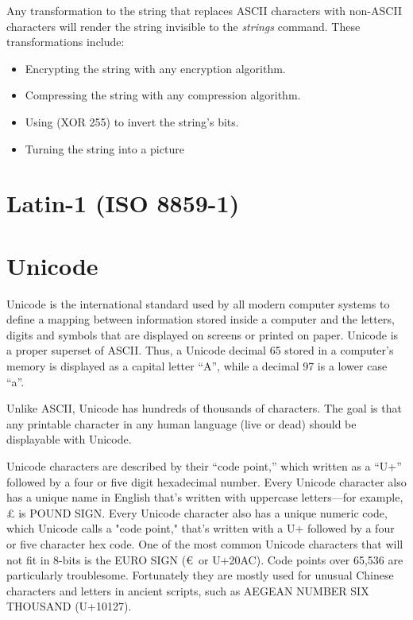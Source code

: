 Any transformation to the string that replaces ASCII characters with
non-ASCII characters will render the string invisible to the
\emph{strings} command. These transformations include:

\begin{itemize}
\item Encrypting the string with any encryption algorithm.
\item Compressing the string with any compression algorithm.
\item Using (XOR 255) to invert the string's bits.
\item Turning the string into a picture
\end{itemize}

\section{Latin-1 (ISO 8859-1)}

\section{Unicode}


Unicode is the international standard used by all modern computer
systems to define a mapping between information stored inside a
computer and the letters, digits and symbols that are displayed on
screens or printed on paper. Unicode is a proper superset of
ASCII. Thus, a Unicode decimal 65
stored in a computer's memory is displayed as a capital letter
``A'', while a decimal 97 is a lower case ``a''.

Unlike ASCII, Unicode has hundreds of thousands of characters. The
goal is that any printable character in any human language (live or
dead) should be displayable with Unicode. 

Unicode characters are described by their ``code point,'' which
written as a ``U+'' followed by a four or five digit hexadecimal
number. Every Unicode
character also has a unique name in English that's
written with uppercase letters---for example, \pounds\xspace is POUND SIGN. Every
Unicode character also has a unique numeric code, which Unicode calls
a "code point," that's written with a U+ followed by a four or five
character hex code. One of the most common Unicode characters that
will not fit in 8-bits is the EURO SIGN (\euro~or U+20AC). Code points over 65,536 are
particularly troublesome. Fortunately they are mostly used for unusual
Chinese characters and letters in ancient scripts, such as AEGEAN
NUMBER SIX THOUSAND (U+10127).

